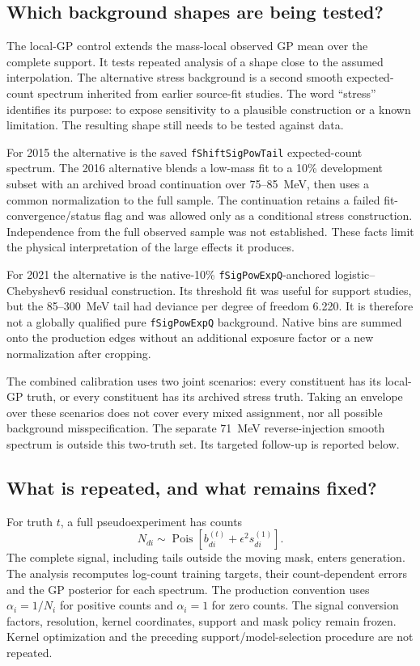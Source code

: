 \subsection{Which background shapes are being tested?}
\label{v5-sec:calibration-truths}
The local-GP control extends the mass-local observed GP mean over the
complete support. It tests repeated analysis of a shape close to the
assumed interpolation. The alternative stress background is a second smooth
expected-count spectrum inherited from earlier source-fit studies. The
word ``stress'' identifies its purpose: to expose sensitivity to a plausible
construction or a known limitation. The resulting shape still needs to be
tested against data.

For 2015 the alternative is the saved \texttt{fShiftSigPowTail}
expected-count spectrum. The 2016 alternative blends a low-mass fit to a
10\% development subset with an archived broad continuation over
75--85~MeV, then uses a common normalization to the full sample. The
continuation retains a failed fit-convergence/status flag and was allowed only as a
conditional stress construction. Independence from the full observed
sample was not established. These facts limit the physical interpretation
of the large effects it produces.

For 2021 the alternative is the native-10\%
\texttt{fSigPowExpQ}-anchored logistic--Chebyshev6 residual construction.
Its threshold fit was useful for support studies, but the 85--300~MeV
tail had deviance per degree of freedom 6.220. It is therefore not a
globally qualified pure \texttt{fSigPowExpQ} background. Native bins are
summed onto the production edges without an additional exposure factor
or a new normalization after cropping.

The combined calibration uses two joint scenarios: every constituent
has its local-GP truth, or every constituent has its archived stress truth.
Taking an envelope over these scenarios does not cover every mixed
assignment, nor all possible background misspecification. The separate
71~MeV reverse-injection smooth spectrum is outside this two-truth set.
Its targeted follow-up is reported below.

\subsection{What is repeated, and what remains fixed?}
For truth $t$, a full pseudoexperiment has counts
\begin{equation}
 N_{di}\sim\operatorname{Pois}\left[b^{(t)}_{di}
                  +\epsilon^2 s^{(1)}_{di}\right].
 \label{v5-eq:calibration-generation}
\end{equation}
The complete signal, including tails outside the moving mask, enters
generation. The analysis recomputes log-count training targets, their
count-dependent errors and the GP posterior for each spectrum. The
production convention uses $\alpha_i=1/N_i$ for positive counts and
$\alpha_i=1$ for zero counts. The signal conversion factors, resolution,
kernel coordinates, support and mask policy remain frozen. Kernel
optimization and the preceding support/model-selection procedure are
not repeated.

